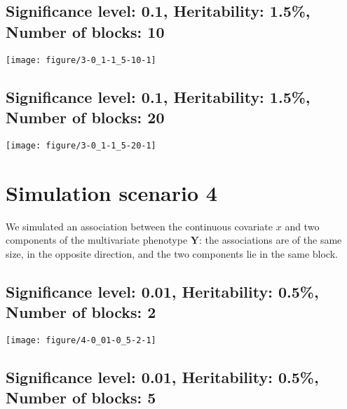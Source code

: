 \documentclass[11pt,letter]{article}\usepackage[]{graphicx}\usepackage[]{color}
\makeatletter
\def\maxwidth{ %
  \ifdim\Gin@nat@width>\linewidth
    \linewidth
  \else
    \Gin@nat@width
  \fi
}
\newenvironment{knitrout}{}{} %
\makeatother
\begin{document}
\newpage
\subsection{Significance level: 0.1, Heritability: 1.5\%, Number of blocks: 10}

\begin{knitrout}
\color{fgcolor}
\texttt{[image: figure/3-0\_1-1\_5-10-1]} 

\end{knitrout}

\newpage
\subsection{Significance level: 0.1, Heritability: 1.5\%, Number of blocks: 20}

\begin{knitrout}
\color{fgcolor}
\texttt{[image: figure/3-0\_1-1\_5-20-1]} 

\end{knitrout}

\newpage

\section{Simulation scenario 4}

We simulated an association between the continuous covariate $x$ and two components of the multivariate phenotype $\mathbf{Y}$: the associations are of the same size, in the opposite direction, and the two components lie in the same block.

\newpage




\subsection{Significance level: 0.01, Heritability: 0.5\%, Number of blocks: 2}

\begin{knitrout}
\color{fgcolor}
\texttt{[image: figure/4-0\_01-0\_5-2-1]} 

\end{knitrout}

\newpage
\subsection{Significance level: 0.01, Heritability: 0.5\%, Number of blocks: 5}
\end{document}
